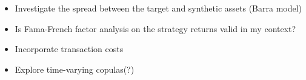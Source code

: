 \documentclass[
  letterpaper,
  DIV=11,
  numbers=noendperiod]{scrartcl}
\providecommand{\tightlist}{%
  \setlength{\itemsep}{0pt}\setlength{\parskip}{0pt}}\usepackage{longtable,booktabs,array}
\begin{document}
\begin{itemize}
\tightlist
\item
  Investigate the spread between the target and synthetic assets (Barra
  model)
\end{itemize}

\begin{itemize}
\tightlist
\item
  Is Fama-French factor analysis on the strategy returns valid in my
  context?
\end{itemize}

\begin{itemize}
\tightlist
\item
  Incorporate transaction costs
\end{itemize}

\begin{itemize}
\tightlist
\item
  Explore time-varying copulas(?)
\end{itemize}
\end{document}
